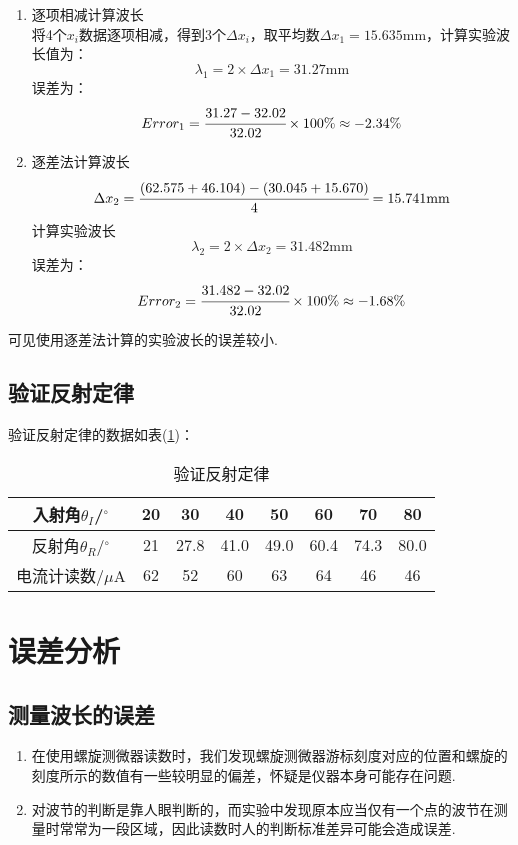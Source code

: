 \documentclass[a4paper]{article}
\begin{document}
\begin{enumerate}
\item 逐项相减计算波长\\
将4个$x_i$数据逐项相减，得到3个$\Delta x_i$，取平均数$\Delta x_1 = 15.635$mm，计算实验波长值为：
\begin{equation}
\lambda_1 = 2\times\Delta x_1 = 31.27\text{mm}
\end{equation}
误差为：
\begin{equation}
Error_1 = \cfrac{31.27 - 32.02}{32.02}\times 100\% \approx -2.34\%
\end{equation}
\item 逐差法计算波长\\
\begin{equation}
\Delta x_2 = \cfrac{(62.575+46.104) - (30.045+15.670)}{4} = 15.741\text{mm}
\end{equation}
计算实验波长
\begin{equation}
\lambda_2 = 2\times\Delta x_2 = 31.482\text{mm}
\end{equation}
误差为：
\begin{equation}
Error_2 = \cfrac{31.482 - 32.02}{32.02}\times 100\% \approx -1.68\%
\end{equation}
\end{enumerate}
可见使用逐差法计算的实验波长的误差较小.
\subsection{验证反射定律}
验证反射定律的数据如表(\ref{ReflexLaw})：
\begin{table}[!h]
\centering
\caption{验证反射定律}
\label{ReflexLaw}
\begin{tabular}{|c|c|c|c|c|c|c|c|}
\hline
入射角$\theta_I$/$^\circ$ & 20 & 30   & 40   & 50   & 60   & 70   & 80   \\ \hline
反射角$\theta_R$/$^\circ$ & 21 & 27.8 & 41.0 & 49.0 & 60.4 & 74.3 & 80.0 \\ \hline
电流计读数/$\mu$A           & 62 & 52   & 60   & 63   & 64   & 46   & 46   \\ \hline
\end{tabular}
\end{table}

\section{误差分析}
\iffalse
\subsection{测量波长的误差}
\begin{enumerate}
\item 在使用螺旋测微器读数时，我们发现螺旋测微器游标刻度对应的位置和螺旋的刻度所示的数值有一些较明显的偏差，怀疑是仪器本身可能存在问题.
\item 对波节的判断是靠人眼判断的，而实验中发现原本应当仅有一个点的波节在测量时常常为一段区域，因此读数时人的判断标准差异可能会造成误差.
\end{enumerate}
\end{document}
